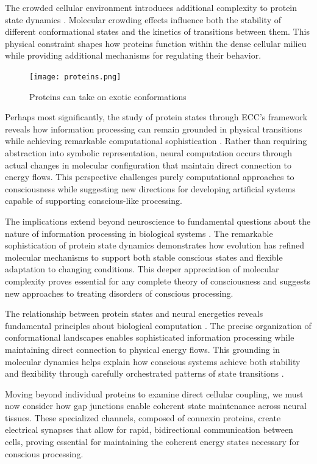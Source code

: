 \begin{refsection}
The crowded cellular environment introduces additional complexity to protein state dynamics \cite{Roh2017}. Molecular crowding effects influence both the stability of different conformational states and the kinetics of transitions between them. This physical constraint shapes how proteins function within the dense cellular milieu while providing additional mechanisms for regulating their behavior.

\begin{figure}[h]
    \centering
    \texttt{[image: proteins.png]}

    \caption{Proteins can take on exotic conformations}
\end{figure}

Perhaps most significantly, the study of protein states through ECC's framework reveals how information processing can remain grounded in physical transitions while achieving remarkable computational sophistication \cite{Oldfield2014}. Rather than requiring abstraction into symbolic representation, neural computation occurs through actual changes in molecular configuration that maintain direct connection to energy flows. This perspective challenges purely computational approaches to consciousness while suggesting new directions for developing artificial systems capable of supporting conscious-like processing.

The implications extend beyond neuroscience to fundamental questions about the nature of information processing in biological systems \cite{Davis2018}. The remarkable sophistication of protein state dynamics demonstrates how evolution has refined molecular mechanisms to support both stable conscious states and flexible adaptation to changing conditions. This deeper appreciation of molecular complexity proves essential for any complete theory of consciousness and suggests new approaches to treating disorders of conscious processing.

The relationship between protein states and neural energetics reveals fundamental principles about biological computation \cite{Erickson2009}. The precise organization of conformational landscapes enables sophisticated information processing while maintaining direct connection to physical energy flows. This grounding in molecular dynamics helps explain how conscious systems achieve both stability and flexibility through carefully orchestrated patterns of state transitions \cite{Royer2006}.

Moving beyond individual proteins to examine direct cellular coupling, we must now consider how gap junctions enable coherent state maintenance across neural tissues. These specialized channels, composed of connexin proteins, create electrical synapses that allow for rapid, bidirectional communication between cells, proving essential for maintaining the coherent energy states necessary for conscious processing.


\end{refsection}

